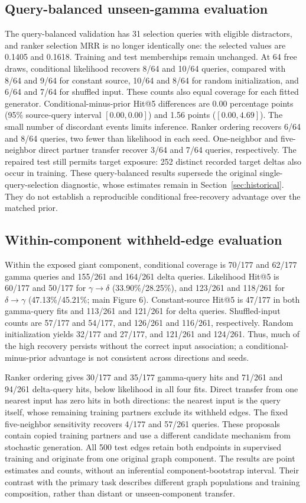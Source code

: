 \documentclass[a4paper,11pt]{article}
\newcommand{\gtd}{\ensuremath{\gamma\!\rightarrow\!\delta}}
\newcommand{\dtg}{\ensuremath{\delta\!\rightarrow\!\gamma}}
\begin{document}
\subsection{Query-balanced unseen-gamma evaluation}
The query-balanced validation has 31 selection queries with eligible distractors, and
ranker selection MRR is no longer identically one: the selected values are
0.1405 and 0.1618. Training and test memberships remain unchanged. At 64 free
draws, conditional likelihood recovers 8/64 and 10/64 queries, compared with
8/64 and 9/64 for constant source, 10/64 and 8/64 for random initialization,
and 6/64 and 7/64 for shuffled input. These counts also equal coverage for
each fitted generator. Conditional-minus-prior Hit@5 differences are 0.00
percentage points (95\% source-query interval $[0.00,0.00]$) and 1.56 points
($[0.00,4.69]$). The small number of discordant events limits inference.
Ranker ordering recovers 6/64 and 8/64 queries, two fewer than likelihood in
each seed. One-neighbor and five-neighbor direct partner transfer recover 3/64
and 7/64 queries, respectively. The repaired test still permits target
exposure: 252 distinct recorded target deltas also occur in training.
These query-balanced results supersede the original single-query-selection
diagnostic, whose estimates remain in Section~\ref{sec:historical}. They do not establish
a reproducible conditional free-recovery advantage over the matched prior.

\subsection{Within-component withheld-edge evaluation}
Within the exposed giant component, conditional coverage is 70/177 and 62/177
gamma queries and 155/261 and 164/261 delta queries. Likelihood Hit@5 is
60/177 and 50/177 for \gtd{} (33.90\%/28.25\%), and 123/261 and 118/261 for
\dtg{} (47.13\%/45.21\%; main Figure 6). Constant-source
Hit@5 is 47/177 in both gamma-query fits and 113/261 and 121/261 for delta
queries. Shuffled-input counts are 57/177 and 54/177, and 126/261 and 116/261,
respectively. Random initialization yields 32/177 and 27/177, and 121/261 and
124/261. Thus, much of the high recovery persists without the correct input
association; a conditional-minus-prior advantage is not consistent across
directions and seeds.

Ranker ordering gives 30/177 and 35/177 gamma-query hits and 71/261 and 94/261
delta-query hits, below likelihood in all four fits. Direct transfer from one
nearest input has zero hits in both directions: the nearest input is the query
itself, whose remaining training partners exclude its withheld edges. The fixed five-neighbor
sensitivity recovers 4/177 and 57/261 queries. These proposals contain copied
training partners and use a different candidate mechanism from stochastic
generation. All 500 test edges retain both endpoints in supervised training
and originate from one original graph component. The results are point
estimates and counts, without an inferential component-bootstrap interval.
Their contrast with the primary task describes different graph populations
and training composition, rather than distant or unseen-component transfer.
\end{document}
